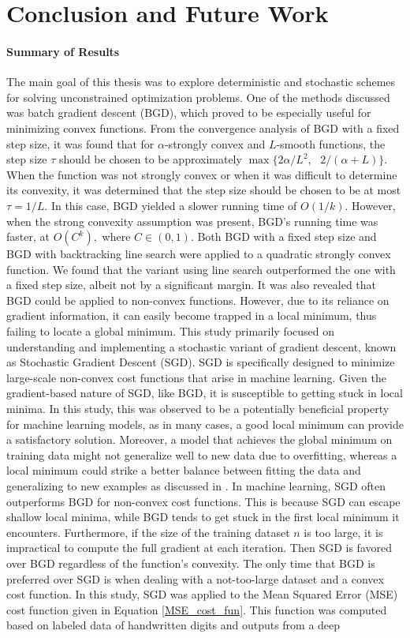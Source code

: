 \section{Conclusion and Future Work}
\paragraph{Summary of Results}
The main goal of this thesis was to explore deterministic and stochastic schemes for solving unconstrained optimization problems. One of the methods discussed was batch gradient descent (BGD), which proved to be especially useful for minimizing convex functions. From the convergence analysis of BGD with a fixed step size, it was found that for $\alpha$-strongly convex and $L$-smooth functions, the step size $\tau$ should be chosen to be approximately $\max\{2\alpha/L^{2}, \text{ } 2/(\alpha + L)\}.$ When the function was not strongly convex or when it was difficult to determine its convexity, it was determined that the step size should be chosen to be at most $\tau=1/L.$ In this case, BGD yielded a slower running time of $O(1/k)$. However, when the strong convexity assumption was present, BGD's running time was faster, at $O(C^{k}),$ where $C\in(0,1)$. Both BGD with a fixed step size and BGD with backtracking line search were applied to a quadratic strongly convex function. We found that the variant using line search outperformed the one with a fixed step size, albeit not by a significant margin. It was also revealed that BGD could be applied to non-convex functions. However, due to its reliance on gradient information, it can easily become trapped in a local minimum, thus failing to locate a global minimum. This study primarily focused on understanding and implementing a stochastic variant of gradient descent, known as Stochastic Gradient Descent (SGD). SGD is specifically designed to minimize large-scale non-convex cost functions that arise in machine learning. Given the gradient-based nature of SGD, like BGD, it is susceptible to getting stuck in local minima. In this study, this was observed to be a potentially beneficial property for machine learning models, as in many cases, a good local minimum can provide a satisfactory solution.  Moreover, a model that achieves the global minimum on training data might not generalize well to new data due to overfitting, whereas a local minimum could strike a better balance between fitting the data and generalizing to new examples as discussed in \cite[282-290]{Goodfellow-et-al-2016}. In machine learning, SGD often outperforms BGD for non-convex cost functions. This is because SGD can escape shallow local minima, while BGD tends to get stuck in the first local minimum it encounters. Furthermore, if the size of the training dataset $n$ is too large, it is impractical to compute the full gradient at each iteration. Then SGD is favored over BGD regardless of the function's convexity. The only time that BGD is preferred over SGD is when dealing with a not-too-large dataset and a convex cost function. In this study, SGD was applied to the Mean Squared Error (MSE) cost function given in Equation \eqref{MSE_cost_fun}. This function was computed based on labeled data of handwritten digits and outputs from a deep 